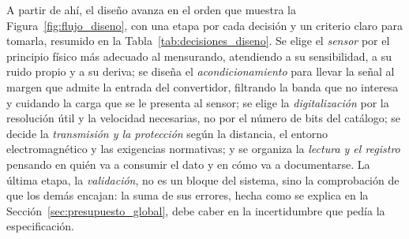 A partir de ahí, el diseño avanza en el orden que muestra la Figura~\ref{fig:flujo_diseno}, con una etapa por cada decisión y un criterio claro para tomarla, resumido en la Tabla~\ref{tab:decisiones_diseno}. Se elige el \emph{sensor} por el principio físico más adecuado al mensurando, atendiendo a su sensibilidad, a su ruido propio y a su deriva; se diseña el \emph{acondicionamiento} para llevar la señal al margen que admite la entrada del convertidor, filtrando la banda que no interesa y cuidando la carga que se le presenta al sensor; se elige la \emph{digitalización} por la resolución útil y la velocidad necesarias, no por el número de bits del catálogo; se decide la \emph{transmisión y la protección} según la distancia, el entorno electromagnético y las exigencias normativas; y se organiza la \emph{lectura y el registro} pensando en quién va a consumir el dato y en cómo va a documentarse. La última etapa, la \emph{validación}, no es un bloque del sistema, sino la comprobación de que los demás encajan: la suma de sus errores, hecha como se explica en la Sección~\ref{sec:presupuesto_global}, debe caber en la incertidumbre que pedía la especificación.

